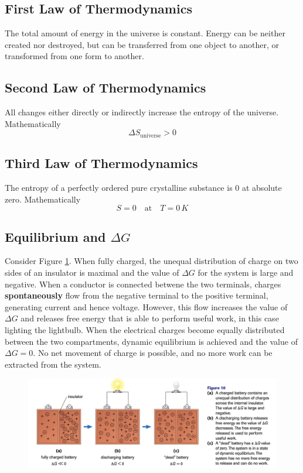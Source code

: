 \subsection{First Law of Thermodynamics}
The total amount of energy in the universe is constant. Energy can be neither created nor destroyed,
but can be transferred from one object to another, or transformed from one form to another.

\subsection{Second Law of Thermodynamics}
All changes either directly or indirectly increase the entropy of the universe. Mathematically
\[
    \Delta S_\mathrm{universe}>0
\]

\subsection{Third Law of Thermodynamics}
The entropy of a perfectly ordered pure crystalline substance is 0 at absolute zero. Mathematically
\[
    S=0\quad\text{at}\quad T=0\,\si{K}
\]

\subsection{Equilibrium and $\Delta G$}
Consider Figure \ref{fig:battery}. When fully charged, the unequal distribution of charge on two
sides of an insulator is maximal and the value of $\Delta G$ for the system is large and negative.
When a conductor is connected betwene the two terminals, charges \textbf{spontaneously} flow from
the negative terminal to the positive terminal, generating current and hence voltage. However,
this flow increases the value of $\Delta G$ and releases free energy that is able to perform
useful work, in this case lighting the lightbulb. When the electrical charges become equally
distributed between the two compartments, dynamic equilibrium is achieved and the value of
$\Delta G=0$. No net movement of charge is possible, and no more work can be extracted from
the system. 

\begin{figure}[ht!]
    \centering
    \includegraphics[width=\textwidth]{../figures/battery}
    \caption{}
    \label{fig:battery}
\end{figure}

